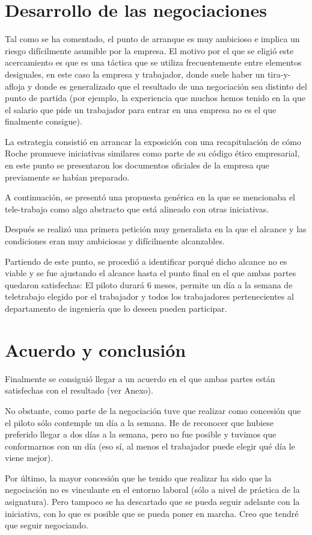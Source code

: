 \section{Desarrollo de las negociaciones}
\par Tal como se ha comentado, el punto de arranque es muy ambicioso e implica un riesgo difícilmente asumible por la empresa. El motivo por el que se eligió este
acercamiento es que es una táctica que se utiliza frecuentemente entre elementos desiguales, en este caso la empresa y trabajador, donde suele haber un
tira-y-afloja y donde es generalizado que el resultado de una negociación sea distinto del punto de partida (por ejemplo, la experiencia que muchos hemos tenido en
la que el salario que pide un trabajador para entrar en una empresa no es el que finalmente consigue).
\par La estrategia consistió en arrancar la exposición con una recapitulación de cómo Roche promueve iniciativas similares como parte de su código ético empresarial, en este punto se presentaron los documentos oficiales de la empresa que previamente se habían preparado.
\par A continuación, se presentó una propuesta genérica en la que se mencionaba el tele-trabajo como algo abstracto que está alineado con otras iniciativas.
\par Después se realizó una primera petición muy generalista en la que el alcance y las condiciones eran muy ambiciosas y difícilmente alcanzables.
\par Partiendo de este punto, se procedió a identificar porqué dicho alcance no es viable y se fue ajustando el alcance hasta el punto final en el que ambas partes
quedaron satisfechas: El piloto durará 6 meses, permite un día a la semana de teletrabajo elegido por el trabajador y todos los trabajadores pertenecientes al
departamento de ingeniería que lo deseen pueden participar.

\section{Acuerdo y conclusión}
\par Finalmente se consiguió llegar a un acuerdo en el que ambas partes están satisfechas con el resultado (ver Anexo).
\par No obstante, como parte de la negociación tuve que realizar como concesión que el piloto sólo contemple un día a la semana. He de reconocer que hubiese preferido llegar a dos días a la semana, pero no fue posible y tuvimos que conformarnos con un día (eso sí, al menos el trabajador puede elegir qué día le viene mejor).
\par Por último, la mayor concesión que he tenido que realizar ha sido que la negociación no es vinculante en el entorno laboral (sólo a nivel de práctica de la
asignatura). Pero tampoco se ha descartado que se pueda seguir adelante con la iniciativa, con lo que es posible que se pueda poner en marcha. Creo que tendré que
seguir negociando.
